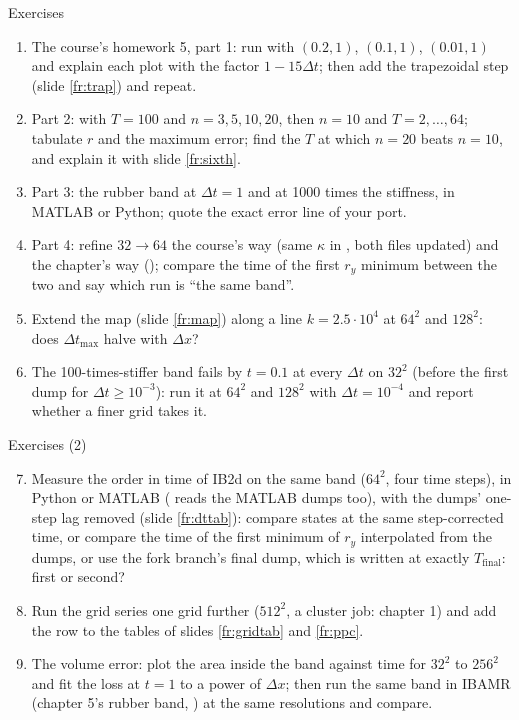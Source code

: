 \documentclass[aspectratio=169,11pt]{beamer}
\begin{document}
\begin{frame}{Exercises}
\label{fr:exercises}
\small
\begin{enumerate}
  \item The course's homework 5, part 1: run  with $(0.2, 1)$, $(0.1, 1)$, $(0.01, 1)$ and explain each plot with the factor $1 - 15\Delta t$; then add the trapezoidal step (slide \ref{fr:trap}) and repeat.
  \item Part 2:  with $T = 100$ and $n = 3, 5, 10, 20$, then $n = 10$ and $T = 2, \ldots, 64$; tabulate $r$ and the maximum error; find the $T$ at which $n = 20$ beats $n = 10$, and explain it with slide \ref{fr:sixth}.
  \item Part 3: the rubber band at $\Delta t = 1$ and at 1000 times the stiffness, in MATLAB or Python; quote the exact error line of your port.
  \item Part 4: refine $32 \to 64$ the course's way (same $\kappa$ in , both files updated) and the chapter's way (); compare the time of the first $r_y$ minimum between the two and say which run is ``the same band''.
  \item Extend the map (slide \ref{fr:map}) along a line $k = 2.5 \cdot 10^4$ at $64^2$ and $128^2$: does $\Delta t_{\max}$ halve with $\Delta x$?
  \item The 100-times-stiffer band fails by $t = 0.1$ at every $\Delta t$ on $32^2$ (before the first dump for $\Delta t \ge 10^{-3}$): run it at $64^2$ and $128^2$ with $\Delta t = 10^{-4}$ and report whether a finer grid takes it.
\end{enumerate}
\end{frame}

\begin{frame}{Exercises (2)}
\label{fr:exercises2}
\small
\begin{enumerate}
  \setcounter{enumi}{6}
  \item Measure the order in time of IB2d on the same band ($64^2$, four time steps), in Python or MATLAB ( reads the MATLAB dumps too), with the dumps' one-step lag removed (slide \ref{fr:dttab}): compare states at the same step-corrected time, or compare the time of the first minimum of $r_y$ interpolated from the dumps, or use the fork branch's final dump, which is written at exactly $T_{\text{final}}$: first or second?
  \item Run the grid series one grid further ($512^2$, a cluster job: chapter 1) and add the row to the tables of slides \ref{fr:gridtab} and \ref{fr:ppc}.
  \item The volume error: plot the area inside the band against time for $32^2$ to $256^2$ and fit the loss at $t = 1$ to a power of $\Delta x$; then run the same band in IBAMR (chapter 5's rubber band, ) at the same resolutions and compare.
\end{enumerate}
\end{frame}
\end{document}
